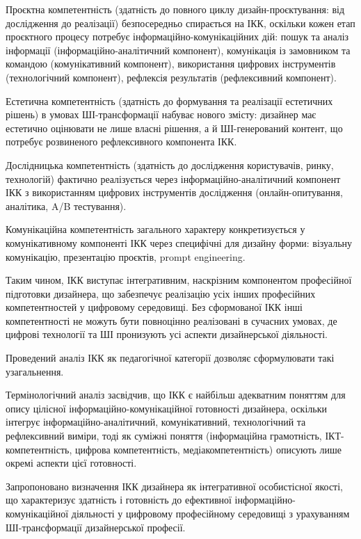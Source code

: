 Проєктна компетентність (здатність до повного циклу дизайн-проєктування: від дослідження до реалізації) безпосередньо спирається на ІКК, оскільки кожен етап проєктного процесу потребує інформаційно-комунікаційних дій: пошук та аналіз інформації (інформаційно-аналітичний компонент), комунікація із замовником та командою (комунікативний компонент), використання цифрових інструментів (технологічний компонент), рефлексія результатів (рефлексивний компонент).

Естетична компетентність (здатність до формування та реалізації естетичних рішень) в умовах ШІ-трансформації набуває нового змісту: дизайнер має естетично оцінювати не лише власні рішення, а й ШІ-генерований контент, що потребує розвиненого рефлексивного компонента ІКК.

Дослідницька компетентність (здатність до дослідження користувачів, ринку, технологій) фактично реалізується через інформаційно-аналітичний компонент ІКК з використанням цифрових інструментів дослідження (онлайн-опитування, аналітика, A/B тестування).

Комунікаційна компетентність загального характеру конкретизується у комунікативному компоненті ІКК через специфічні для дизайну форми: візуальну комунікацію, презентацію проєктів, prompt engineering.

Таким чином, ІКК виступає інтегративним, наскрізним компонентом професійної підготовки дизайнера, що забезпечує реалізацію усіх інших професійних компетентностей у цифровому середовищі. Без сформованої ІКК інші компетентності не можуть бути повноцінно реалізовані в сучасних умовах, де цифрові технології та ШІ пронизують усі аспекти дизайнерської діяльності.


Проведений аналіз ІКК як педагогічної категорії дозволяє сформулювати такі узагальнення.

Термінологічний аналіз засвідчив, що ІКК є найбільш адекватним поняттям для опису цілісної інформаційно-комунікаційної готовності дизайнера, оскільки інтегрує інформаційно-аналітичний, комунікативний, технологічний та рефлексивний виміри, тоді як суміжні поняття (інформаційна грамотність, ІКТ-компетентність, цифрова компетентність, медіакомпетентність) описують лише окремі аспекти цієї готовності.

Запропоновано визначення ІКК дизайнера як інтегративної особистісної якості, що характеризує здатність і готовність до ефективної інформаційно-комунікаційної діяльності у цифровому професійному середовищі з урахуванням ШІ-трансформації дизайнерської професії.

